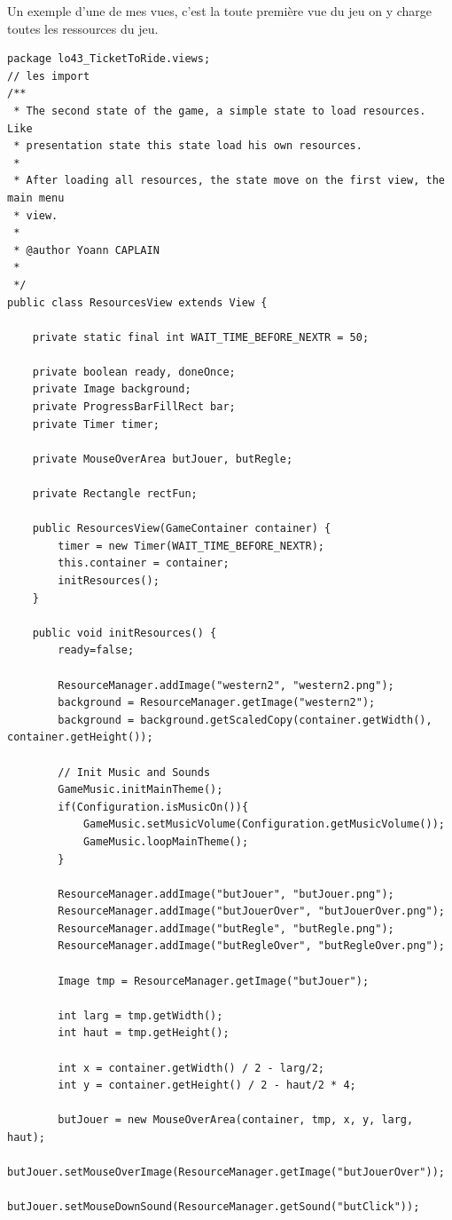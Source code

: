 \documentclass{report}
\begin{document}
Un exemple d'une de mes vues, c'est la toute première vue du jeu on y charge toutes les ressources du jeu.
\label {exempleVue}
\begin{lstlisting}[caption=ResourcesView]
package lo43_TicketToRide.views;
// les import
/**
 * The second state of the game, a simple state to load resources. Like
 * presentation state this state load his own resources.
 * 
 * After loading all resources, the state move on the first view, the main menu
 * view.
 * 
 * @author Yoann CAPLAIN
 * 
 */
public class ResourcesView extends View {

	private static final int WAIT_TIME_BEFORE_NEXTR = 50;

	private boolean ready, doneOnce;
	private Image background;
	private ProgressBarFillRect bar;
	private Timer timer;

	private MouseOverArea butJouer, butRegle;
	
	private Rectangle rectFun;
	
	public ResourcesView(GameContainer container) {
		timer = new Timer(WAIT_TIME_BEFORE_NEXTR);
		this.container = container;
		initResources();
	}

	public void initResources() {
		ready=false;
		
		ResourceManager.addImage("western2", "western2.png");
		background = ResourceManager.getImage("western2");
		background = background.getScaledCopy(container.getWidth(), container.getHeight());
		
		// Init Music and Sounds
		GameMusic.initMainTheme();
		if(Configuration.isMusicOn()){
			GameMusic.setMusicVolume(Configuration.getMusicVolume());
			GameMusic.loopMainTheme();
		}
		
		ResourceManager.addImage("butJouer", "butJouer.png");
		ResourceManager.addImage("butJouerOver", "butJouerOver.png");
		ResourceManager.addImage("butRegle", "butRegle.png");
		ResourceManager.addImage("butRegleOver", "butRegleOver.png");
		
		Image tmp = ResourceManager.getImage("butJouer");
		
		int larg = tmp.getWidth();
		int haut = tmp.getHeight();
		
		int x = container.getWidth() / 2 - larg/2;
		int y = container.getHeight() / 2 - haut/2 * 4;
		
		butJouer = new MouseOverArea(container, tmp, x, y, larg, haut);
		butJouer.setMouseOverImage(ResourceManager.getImage("butJouerOver"));
		butJouer.setMouseDownSound(ResourceManager.getSound("butClick"));
		

\end{lstlisting}
\end{document}
